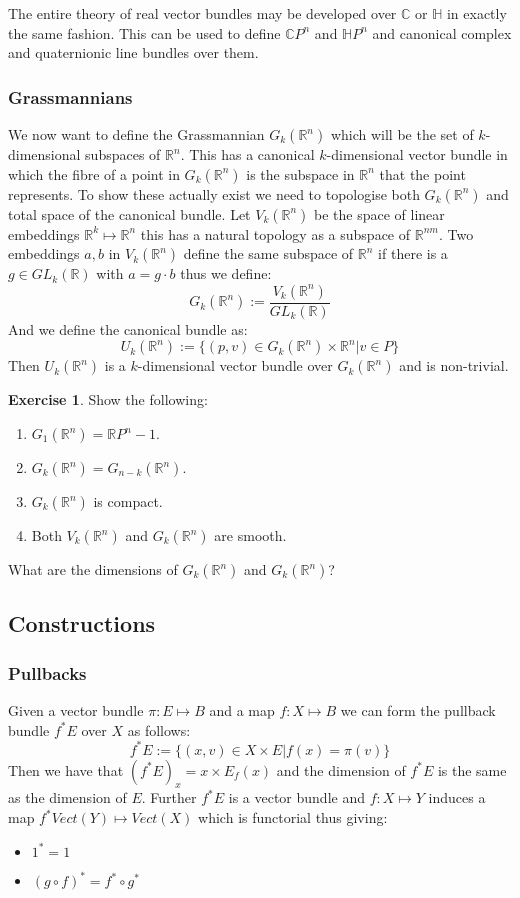 \documentclass[a4paper,10pt]{article}
\theoremstyle{plain}%
\theoremstyle{definition}
\newtheorem{exer}{Exercise}
\theoremstyle{remark}
\newcommand{\RR}{\mathbb{R}}
\newcommand{\CC}{\mathbb{C}}
\newcommand{\HH}{\mathbb{H}}
\begin{document}
The entire theory of real vector bundles may be developed over $\CC$ or $\HH$ in exactly the same fashion. This can
be used to define $\CC P^n$ and $\HH P^n$ and canonical complex and quaternionic line bundles over them.

\subsubsection{Grassmannians}

We now want to define the Grassmannian $G_k(\RR^n)$ which will be the set of $k$-dimensional subspaces of $\RR^n$.
This has a canonical $k$-dimensional vector bundle in which the fibre of a point in $G_k(\RR^n)$ is the subspace 
in $\RR^n$ that the point represents. 
To show these actually exist we need to topologise both $G_k(\RR^n)$ and total space of the canonical bundle.
Let $V_k(\RR^n)$ be the space of linear embeddings $\RR^k\mapsto \RR^n$ this has a natural topology as a subspace of
$\RR^{n m}$. Two embeddings $a,b$ in $V_k(\RR^n)$ define the same subspace of $\RR^n$ if there is a $g\in GL_k(\RR)$
with $a=g\cdot b$ thus we define:
$$G_k(\RR^n):=\frac{V_k(\RR^n)}{GL_k(\RR)}$$
And we define the canonical bundle as:
$$U_k(\RR^n):=\{(p,v)\in G_k(\RR^n)\times \RR^n | v\in P\}$$
Then $U_k(\RR^n)$ is a $k$-dimensional vector bundle over $G_k(\RR^n)$ and is non-trivial.

\begin{exer}
Show the following:
 \begin{enumerate}
  \item $G_1(\RR^n)=\RR P^n-1$.
  \item $G_k(\RR^n) = G_{n-k}(\RR^n)$.
  \item $G_k(\RR^n)$ is compact.
  \item Both $V_k(\RR^n)$ and $G_k(\RR^n)$ are smooth.
 \end{enumerate}
What are the dimensions of $G_k(\RR^n)$ and $G_k(\RR^n)$?
\end{exer}

\subsection{Constructions}

\subsubsection{Pullbacks}

Given a vector bundle $\pi:E\mapsto B$ and a map $f:X\mapsto B$ we can form the pullback bundle
$f^\ast E$ over $X$ as follows:
$$f^\ast E := \{ (x,v) \in X\times E | f(x)=\pi(v)\}$$
Then we have that $(f^\ast E)_x=x\times E_f(x)$ and the dimension of $f^\ast E$ is the same as
the dimension of $E$. Further $f^\ast E$ is a vector bundle and $f:X\mapsto Y$ induces a map
$f^\ast Vect(Y)\mapsto Vect(X)$ which is functorial thus giving:
\begin{itemize}
 \item $1^\ast = 1$
 \item $(g\circ f)^\ast = f^\ast \circ g^\ast$
\end{itemize}
\end{document}
